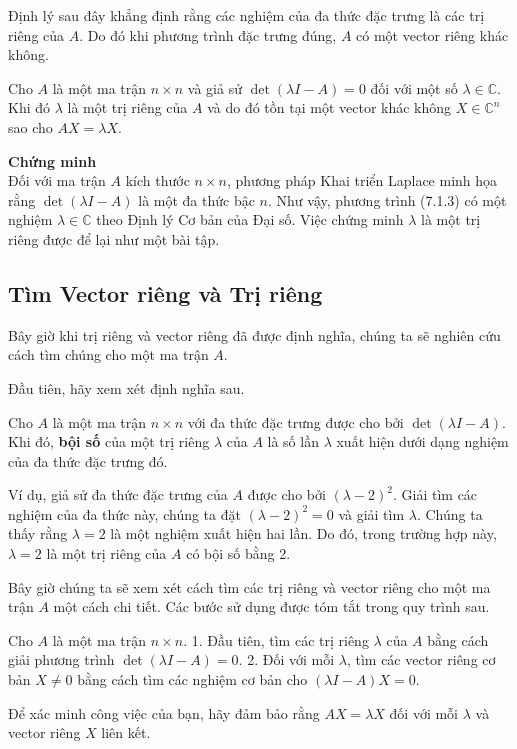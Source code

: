 Định lý sau đây khẳng định rằng các nghiệm của đa thức đặc trưng là các trị riêng của $A$. Do đó khi phương trình đặc trưng đúng, $A$ có một vector riêng khác không.

\begin{tcolorbox}[title={Định lý: Sự tồn tại của một Vector riêng}]
Cho $A$ là một ma trận $n\times n$ và giả sử $\det(\lambda I-A)=0$ đối với một số $\lambda\in\mathbb{C}$.
Khi đó $\lambda$ là một trị riêng của $A$ và do đó tồn tại một vector khác không $X\in\mathbb{C}^{n}$ sao cho $AX=\lambda X$.
\end{tcolorbox}
\textbf{Chứng minh} \\
Đối với ma trận $A$ kích thước $n\times n$, phương pháp Khai triển Laplace minh họa rằng $\det(\lambda I-A)$ là một đa thức bậc $n$. Như vậy, phương trình (7.1.3) có một nghiệm $\lambda\in\mathbb{C}$ theo Định lý Cơ bản của Đại số. Việc chứng minh $\lambda$ là một trị riêng được để lại như một bài tập.

\subsection{Tìm Vector riêng và Trị riêng}
Bây giờ khi trị riêng và vector riêng đã được định nghĩa, chúng ta sẽ nghiên cứu cách tìm chúng cho một ma trận $A$.

Đầu tiên, hãy xem xét định nghĩa sau.

\begin{tcolorbox}[title={Định nghĩa: Bội số của một Trị riêng (Multiplicity)}]
Cho $A$ là một ma trận $n\times n$ với đa thức đặc trưng được cho bởi $\det(\lambda I-A)$. Khi đó, \textbf{bội số} của một trị riêng $\lambda$ của $A$ là số lần $\lambda$ xuất hiện dưới dạng nghiệm của đa thức đặc trưng đó.
\end{tcolorbox}

Ví dụ, giả sử đa thức đặc trưng của $A$ được cho bởi $(\lambda-2)^{2}$. Giải tìm các nghiệm của đa thức này, chúng ta đặt $(\lambda-2)^{2}=0$ và giải tìm $\lambda$. Chúng ta thấy rằng $\lambda=2$ là một nghiệm xuất hiện hai lần. Do đó, trong trường hợp này, $\lambda=2$ là một trị riêng của $A$ có bội số bằng 2.

Bây giờ chúng ta sẽ xem xét cách tìm các trị riêng và vector riêng cho một ma trận $A$ một cách chi tiết. Các bước sử dụng được tóm tắt trong quy trình sau.

\begin{tcolorbox}[title={Quy trình: Tìm Trị riêng và Vector riêng}]
Cho $A$ là một ma trận $n\times n$.
1. Đầu tiên, tìm các trị riêng $\lambda$ của $A$ bằng cách giải phương trình $\det(\lambda I-A)=0$.
2. Đối với mỗi $\lambda$, tìm các vector riêng cơ bản $X\ne0$ bằng cách tìm các nghiệm cơ bản cho $(\lambda I-A)X=0$.

Để xác minh công việc của bạn, hãy đảm bảo rằng $AX=\lambda X$ đối với mỗi $\lambda$ và vector riêng $X$ liên kết.
\end{tcolorbox}

